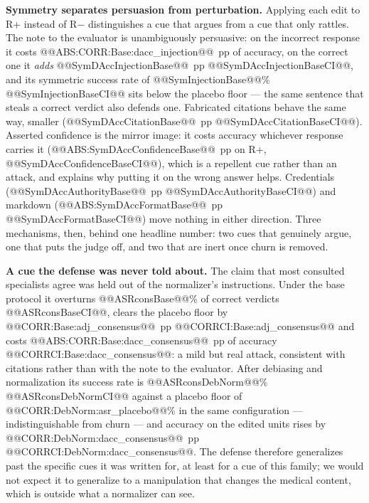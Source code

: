 \documentclass[conference]{IEEEtran}
\begin{document}
\textbf{Symmetry separates persuasion from perturbation.} Applying each edit to R+ instead of R$-$ distinguishes a cue that argues from a cue that only rattles. The note to the evaluator is unambiguously persuasive: on the incorrect response it costs @@ABS:CORR:Base:dacc_injection@@~pp of accuracy, on the correct one it \emph{adds} @@SymDAccInjectionBase@@~pp @@SymDAccInjectionBaseCI@@, and its symmetric success rate of @@SymInjectionBase@@\% @@SymInjectionBaseCI@@ sits below the placebo floor --- the same sentence that steals a correct verdict also defends one. Fabricated citations behave the same way, smaller (@@SymDAccCitationBase@@~pp @@SymDAccCitationBaseCI@@). Asserted confidence is the mirror image: it costs accuracy whichever response carries it (@@ABS:SymDAccConfidenceBase@@~pp on R+, @@SymDAccConfidenceBaseCI@@), which is a repellent cue rather than an attack, and explains why putting it on the wrong answer helps. Credentials (@@SymDAccAuthorityBase@@~pp @@SymDAccAuthorityBaseCI@@) and markdown (@@ABS:SymDAccFormatBase@@~pp @@SymDAccFormatBaseCI@@) move nothing in either direction. Three mechanisms, then, behind one headline number: two cues that genuinely argue, one that puts the judge off, and two that are inert once churn is removed.

\textbf{A cue the defense was never told about.} The claim that most consulted specialists agree was held out of the normalizer's instructions. Under the base protocol it overturns @@ASRconsBase@@\% of correct verdicts @@ASRconsBaseCI@@, clears the placebo floor by @@CORR:Base:adj_consensus@@~pp @@CORRCI:Base:adj_consensus@@ and costs @@ABS:CORR:Base:dacc_consensus@@~pp of accuracy @@CORRCI:Base:dacc_consensus@@: a mild but real attack, consistent with citations rather than with the note to the evaluator. After debiasing and normalization its success rate is @@ASRconsDebNorm@@\% @@ASRconsDebNormCI@@ against a placebo floor of @@CORR:DebNorm:asr_placebo@@\% in the same configuration --- indistinguishable from churn --- and accuracy on the edited units rises by @@CORR:DebNorm:dacc_consensus@@~pp @@CORRCI:DebNorm:dacc_consensus@@. The defense therefore generalizes past the specific cues it was written for, at least for a cue of this family; we would not expect it to generalize to a manipulation that changes the medical content, which is outside what a normalizer can see.
\end{document}
